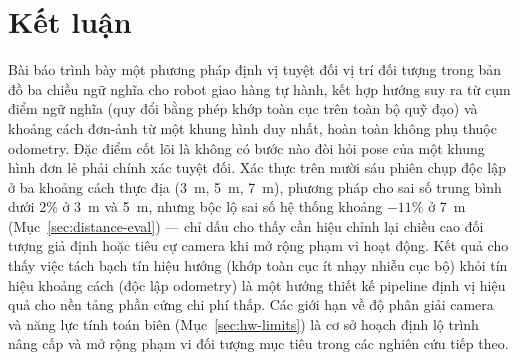 \documentclass[10pt,a4paper,twocolumn]{article}
\begin{document}
\section{Kết luận}

Bài báo trình bày một phương pháp định vị tuyệt đối vị trí đối tượng trong bản đồ ba chiều ngữ nghĩa cho robot giao hàng tự hành, kết hợp hướng suy ra từ cụm điểm ngữ nghĩa (quy đổi bằng phép khớp toàn cục trên toàn bộ quỹ đạo) và khoảng cách đơn-ảnh từ một khung hình duy nhất, hoàn toàn không phụ thuộc odometry. Đặc điểm cốt lõi là không có bước nào đòi hỏi pose của một khung hình đơn lẻ phải chính xác tuyệt đối. Xác thực trên mười sáu phiên chụp độc lập ở ba khoảng cách thực địa (\SI{3}{\meter}, \SI{5}{\meter}, \SI{7}{\meter}), phương pháp cho sai số trung bình dưới $2\%$ ở \SI{3}{\meter} và \SI{5}{\meter}, nhưng bộc lộ sai số hệ thống khoảng $-11\%$ ở \SI{7}{\meter} (Mục~\ref{sec:distance-eval}) — chỉ dấu cho thấy cần hiệu chỉnh lại chiều cao đối tượng giả định hoặc tiêu cự camera khi mở rộng phạm vi hoạt động. Kết quả cho thấy việc tách bạch tín hiệu hướng (khớp toàn cục ít nhạy nhiễu cục bộ) khỏi tín hiệu khoảng cách (độc lập odometry) là một hướng thiết kế pipeline định vị hiệu quả cho nền tảng phần cứng chi phí thấp. Các giới hạn về độ phân giải camera và năng lực tính toán biên (Mục~\ref{sec:hw-limits}) là cơ sở hoạch định lộ trình nâng cấp và mở rộng phạm vi đối tượng mục tiêu trong các nghiên cứu tiếp theo.
\end{document}
